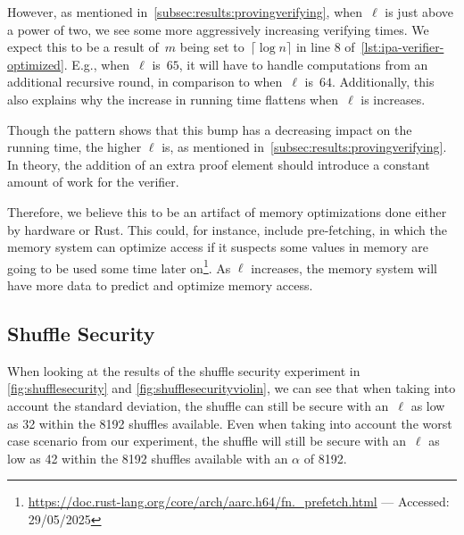 However, as mentioned in~\autoref{subsec:results:provingverifying}, when~$\ell$ is just above a power of two, we see some more aggressively increasing verifying times.
We expect this to be a result of~$m$ being set to~$\lceil\log n\rceil$ in line 8 of~\autoref{lst:ipa-verifier-optimized}.
E.g., when~$\ell$ is~$65$, it will have to handle computations from an additional recursive round, in comparison to when~$\ell$ is~$64$.
Additionally, this also explains why the increase in running time flattens when~$\ell$ is increases.

Though the pattern shows that this bump has a decreasing impact on the running time, the higher $\ell$ is, as mentioned in~\autoref{subsec:results:provingverifying}.
In theory, the addition of an extra proof element should introduce a constant amount of work for the verifier.

Therefore, we believe this to be an artifact of memory optimizations done either by hardware or Rust.
This could, for instance, include pre-fetching, in which the memory system can optimize access if it suspects some values in memory are going to be used some time later on\footnote{\href{https://doc.rust-lang.org/core/arch/aarch64/fn._prefetch.html}{https://doc.rust-lang.org/core/arch/aarc.h64/fn.\_prefetch.html} — Accessed: 29/05/2025}.
As $\ell$ increases, the memory system will have more data to predict and optimize memory access.

\subsection{Shuffle Security}\label{subsec:Discution-Shuffle-security}
When looking at the results of the shuffle security experiment in \autoref{fig:shufflesecurity} and \autoref{fig:shufflesecurityviolin}, we can see that when taking into account the standard deviation, the shuffle can still be secure with an~$\ell$ as low as 32 within the 8192 shuffles available.
Even when taking into account the worst case scenario from our experiment, the shuffle will still be secure with an~$\ell$ as low as 42 within the 8192 shuffles available with an $\alpha$ of 8192.

